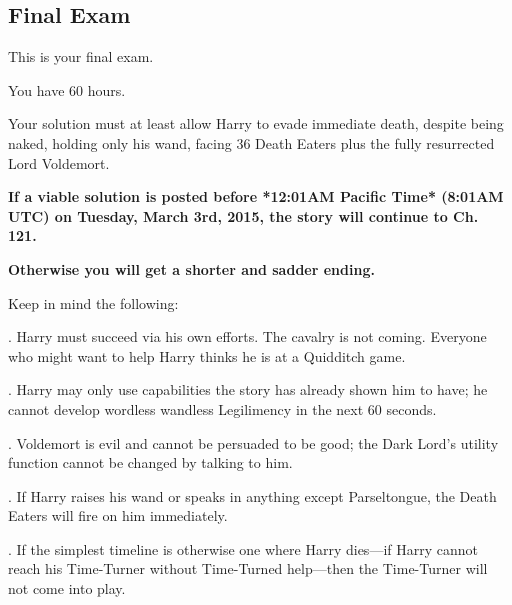 \subsection{\textbf{Final Exam}}

\noindent
This is your final exam.

\vspace*{.5\baselineskip}\noindent
You have 60 hours.

\vspace*{.5\baselineskip}\noindent
Your solution must at least allow Harry to evade immediate death,
despite being naked, holding only his wand, facing 36 Death Eaters
plus the fully resurrected Lord Voldemort.

\vspace*{.5\baselineskip}\noindent
\textbf{If a viable solution is posted before
*12:01AM Pacific Time* (8:01AM UTC) on Tuesday, March 3rd, 2015,
the story will continue to Ch. 121.}

\vspace*{.5\baselineskip}\noindent
\textbf{Otherwise you will get a shorter and sadder ending.}

\vspace*{.5\baselineskip}\noindent
Keep in mind the following:

\vspace*{.5\baselineskip}. Harry must succeed via his own efforts. The cavalry is not coming.
Everyone who might want to help Harry thinks he is at a Quidditch game.

\vspace*{.5\baselineskip}. Harry may only use capabilities the story has already shown him to
have;
he cannot develop wordless wandless Legilimency in the next 60 seconds.

\vspace*{.5\baselineskip}. Voldemort is evil and cannot be persuaded to be good;
the Dark Lord's utility function cannot be changed by talking to him.

\vspace*{.5\baselineskip}. If Harry raises his wand or speaks in anything except Parseltongue,
the Death Eaters will fire on him immediately.

\vspace*{.5\baselineskip}. If the simplest timeline is otherwise one where Harry dies---if 
Harry cannot reach his Time-Turner without Time-Turned help---then 
the Time-Turner will not come into play.


